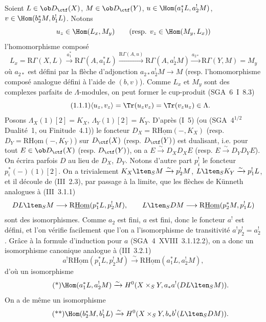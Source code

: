 Soient $L\in \ob D_{\ctf}(X)$, $M\in \ob D_{\ctf}(Y)$, $u\in\Hom(a_1^*L,a_2^!M)$, $v\in\Hom(b_2^*M,b_1^!L)$. Notons
\[
u_z\in\Hom(L_x,M_y)\qquad (\text{resp. }v_z\in\Hom(M_y,L_x))
\]
l'homomorphisme composé
\[
L_x=\mathrm{R}\Gamma(X,L)\xrightarrow{a_1^*}\mathrm{R}\Gamma(A,a_1^*L)
\xrightarrow{\mathrm{R}\Gamma(A,u)}\mathrm{R}\Gamma(A,a_2^!M)
\xrightarrow{a_{2*}}\mathrm{R}\Gamma(Y,M)=M_y
\]
où $a_{2*}$ est défini par la flèche d'adjonction $a_{2*}a_2^!M\to M$ (resp. l'homomorphisme composé analogue défini à l'aide de $(b,v)$). Comme $L_x$ et $M_y$ sont des complexes parfaits de $\Lambda$-modules, on peut former le cup-produit (SGA~6~I~8.3)
\begin{equation}\tag{1.1.1}
\langle u_z,v_z\rangle=\Tr(u_zv_z)=\Tr(v_zu_z)\in\Lambda.
\end{equation}
Posons $\Lambda_X(1)[2]=K_X$, $\Lambda_Y(1)[2]=K_Y$. D'après (I~5) (ou (SGA~$4^{1/2}$ Dualité~1, ou Finitude~4.1)) le foncteur $D_X=\mathrm{R}\underline{\mathrm{Hom}}(-,K_X)$ (resp. $D_Y=\mathrm{R}\underline{\mathrm{Hom}}(-,K_Y)$) sur 
$D_{\ctf}(X)$ (resp. $D_{\ctf}(Y)$) est dualisant, i.e. pour tout $E\in\ob D_{\ctf}(X)$ (resp. $D_{\ctf}(Y)$), on a $E\xrightarrow{\sim}D_XD_XE$ (resp. $E\xrightarrow{\sim}D_YD_YE$). On écrira parfois $D$ au
lieu de $D_X$, $D_Y$. Notons d'autre part $p_i^!$ le foncteur $p_i^*(-)(1)[2]$. On a trivialement $K_X\lten_SM\xrightarrow{\sim}p_2^!M$, $L\lten_SK_Y\xrightarrow{\sim}p_1^!L$, et il découle de (III~2.3), par passage à la limite, que les flèches de Künneth analogues à (III~3.1.1)
\[
DL\lten_SM\longrightarrow \mathrm{R}\underline{\mathrm{Hom}}(p_1^*L,p_2^!M),
\qquad
L\lten_SDM\longrightarrow \mathrm{R}\underline{\mathrm{Hom}}(p_2^*M,p_1^!L)
\]
sont des isomorphismes. Comme $a_2$ est fini, $a$ est fini, donc le foncteur $a^!$ est défini, et l'on vérifie facilement que l'on a l'isomorphisme de transitivité $a^!p_2^!=a_2^!$. Grâce à la formule d'induction pour $a$ (SGA~4~XVIII~3.1.12.2), on a donc un isomorphisme canonique analogue à (III~3.2.1)
\[
a^!\mathrm{R}\underline{\mathrm{Hom}}(p_1^*L,p_2^!M)\xrightarrow{\sim}\mathrm{R}\underline{\mathrm{Hom}}(a_1^*L,a_2^!M),
\]
d'où un isomorphisme
\begin{equation}\tag{*}
\Hom(a_1^*L,a_2^!M)\xrightarrow{\sim}H^0(X\times_S Y,a_*a^!(DL\lten_SM)).
\end{equation}
On a de même un isomorphisme
\begin{equation}\tag{**}
\Hom(b_2^*M,b_1^!L)\xrightarrow{\sim}H^0(X\times_S Y,b_*b^!(L\lten_SDM)).
\end{equation}
